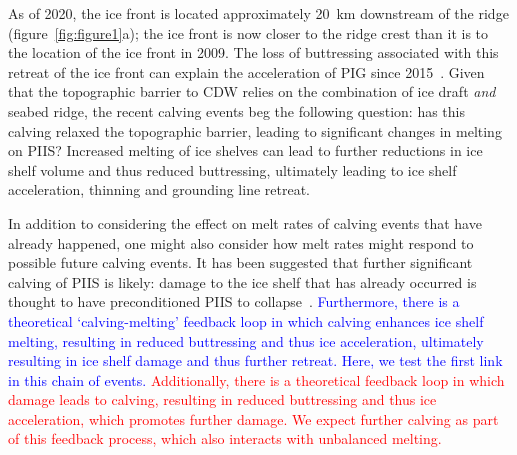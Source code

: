 \documentclass[draft]{agujournal2019}
\newcommand{\red}[1]{\textcolor{red}{#1}}
\newcommand{\blue}[1]{\textcolor{blue}{#1}}
\begin{document}
As of 2020, the ice front is located approximately 20~km downstream of the ridge (figure~\ref{fig:figure1}a); the ice front is now closer to the ridge crest than it is to the location of the ice front in 2009. The loss of buttressing associated with this retreat of the ice front can explain the acceleration of PIG since 2015~\cite{Joughin2021ScienceAdv}. Given that the topographic barrier to CDW relies on the combination of ice draft \textit{and} seabed ridge, the recent calving events beg the following question: has this calving relaxed the topographic barrier, leading to significant changes in melting on PIIS? Increased melting of ice shelves can lead to further reductions in ice shelf volume and thus reduced buttressing, ultimately leading to ice shelf acceleration, thinning and grounding line retreat.

In addition to considering the effect on melt rates of calving events that have already happened, one might also consider how melt rates might respond to possible future calving events. It has been suggested that further significant calving of PIIS is likely: damage to the ice shelf that has already occurred is thought to have preconditioned PIIS to collapse~\cite{Lhermitte2020PNAS}. \blue{Furthermore, there is a theoretical `calving-melting' feedback loop in which calving enhances ice shelf melting, resulting in reduced buttressing and thus ice acceleration, ultimately resulting in ice shelf damage and thus further retreat. Here, we test the first link in this chain of events.} %
 \red{Additionally, there is a theoretical feedback loop in which damage leads to calving, resulting in reduced buttressing and thus ice acceleration, which promotes further damage. We expect further calving as part of this feedback process, which also interacts with unbalanced melting.}
\end{document}
